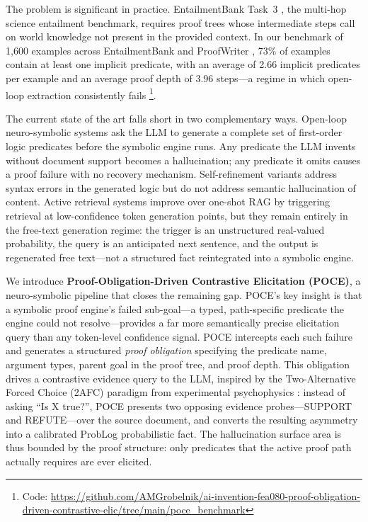 \documentclass[11pt,letterpaper]{article}
\begin{document}
The problem is significant in practice. EntailmentBank Task~3 \citep{Dalvi2021}, the multi-hop
science entailment benchmark, requires proof trees whose intermediate steps call on world knowledge not present in the
provided context. In our benchmark of 1,600 examples across EntailmentBank and ProofWriter \citep{Tafjord2020}, 73\% of examples contain
at least one implicit predicate, with an average of 2.66 implicit predicates per example and an average proof depth of
3.96 steps---a regime in which open-loop extraction consistently fails%
\footnote{Code: \url{https://github.com/AMGrobelnik/ai-invention-fea080-proof-obligation-driven-contrastive-elic/tree/main/poce_benchmark}}.

The current state of the art falls short in two complementary ways. Open-loop neuro-symbolic systems \citep{Olausson2023,Pan2023}
ask the LLM to generate a complete set of first-order logic predicates before the symbolic engine runs. Any predicate
the LLM invents without document support becomes a hallucination; any predicate it omits causes a proof failure with no
recovery mechanism. Self-refinement variants \citep{Kirtania2024} address syntax errors in the generated logic but do not
address semantic hallucination of content. Active retrieval systems \citep{Jiang2023} improve over one-shot RAG \citep{Lewis2020} by triggering
retrieval at low-confidence token generation points, but they remain entirely in the free-text generation regime: the
trigger is an unstructured real-valued probability, the query is an anticipated next sentence, and the output is regenerated
free text---not a structured fact reintegrated into a symbolic engine.

We introduce \textbf{Proof-Obligation-Driven Contrastive Elicitation (POCE)}, a neuro-symbolic pipeline that closes the remaining gap. POCE's key insight is that a symbolic proof
engine's failed sub-goal---a typed, path-specific predicate the engine could not resolve---provides a far more semantically
precise elicitation query than any token-level confidence signal. POCE intercepts each such failure and generates a structured
\emph{proof obligation} specifying the predicate name, argument types, parent goal in the proof tree, and proof depth. This
obligation drives a contrastive evidence query to the LLM, inspired by the Two-Alternative Forced Choice (2AFC) paradigm
from experimental psychophysics \citep{Green1966}: instead of asking ``Is X true?'', POCE presents two opposing evidence probes---SUPPORT
and REFUTE---over the source document, and converts the resulting asymmetry into a calibrated ProbLog probabilistic fact.
The hallucination surface area is thus bounded by the proof structure: only predicates that the active proof path actually
requires are ever elicited.
\end{document}
